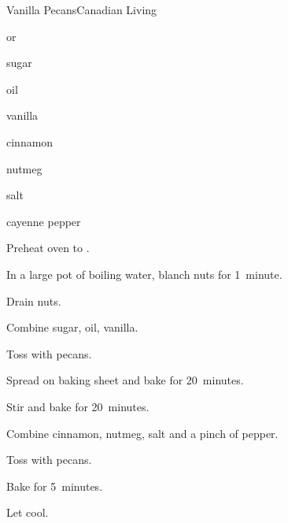 \begin{recipe}{Vanilla Pecans}{Canadian Living}{}

\begin{ingredients}
\item {}  or 
\item \C{\quarter} sugar
\item {} oil
\item {} vanilla
\item {} cinnamon
\item \tp{\half} nutmeg
\item \tp{\quarter} salt
\item cayenne pepper
\end{ingredients}

\begin{directions}
\item Preheat oven to .
\item In a large pot of boiling water, blanch nuts for 1~minute.
\item Drain nuts.
\item Combine sugar, oil, vanilla.
\item Toss with pecans.
\item Spread on baking sheet and bake for 20~minutes.
\item Stir and bake for 20~minutes.
\item Combine cinnamon, nutmeg, salt and a pinch of pepper.
\item Toss with pecans.
\item Bake for 5~minutes.
\item Let cool.
\end{directions}

\end{recipe}
